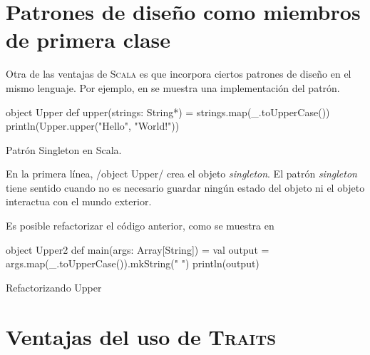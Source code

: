 \section{Patrones de diseño como miembros de primera clase}
\label{sec:patterns}

Otra de las ventajas de \textsc{Scala} es que incorpora ciertos patrones de
diseño en el mismo lenguaje. Por ejemplo, en  se muestra una
implementación del patrón.

\begin{listing}[H]
  \begin{scalacode}
    object Upper {
      def upper(strings: String*) = strings.map(_.toUpperCase())
    }
    println(Upper.upper("Hello", "World!"))
  \end{scalacode}
  \caption{Patrón Singleton en Scala.}
  \label{lst:object}
\end{listing}

En la primera línea, \scalainline/object Upper/ crea el objeto
\emph{singleton}. El patrón \emph{singleton} tiene sentido cuando no es
necesario guardar ningún estado del objeto ni el objeto interactua con el mundo
exterior.

Es posible refactorizar el código anterior, como se muestra en

\begin{listing}[H]
  \begin{scalacode}
    object Upper2 {
      def main(args: Array[String]) = {
        val output = args.map(_.toUpperCase()).mkString(" ")
        println(output)
      }
    }
  \end{scalacode}
  \caption{Refactorizando Upper}
  \label{lst:object2}
\end{listing}

\section{Ventajas del uso de \textsc{Traits}}
\label{sec:traitsadvantajes}

